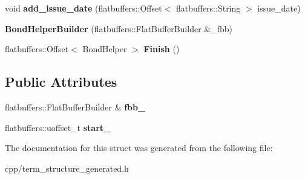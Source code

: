 \begin{DoxyCompactItemize}
\item 
\mbox{\label{structquantra_1_1BondHelperBuilder_a6804d109645fa6898895b99c344c244f}} 
void {\bfseries add\+\_\+issue\+\_\+date} (flatbuffers\+::\+Offset$<$ flatbuffers\+::\+String $>$ issue\+\_\+date)
\item 
\mbox{\label{structquantra_1_1BondHelperBuilder_a44d7b5fe25daab40afcc8d8e37cf4090}} 
{\bfseries Bond\+Helper\+Builder} (flatbuffers\+::\+Flat\+Buffer\+Builder \&\+\_\+fbb)
\item 
\mbox{\label{structquantra_1_1BondHelperBuilder_a6cec33d17e2561696a1509f91e795d40}} 
flatbuffers\+::\+Offset$<$ Bond\+Helper $>$ {\bfseries Finish} ()
\end{DoxyCompactItemize}
\subsection*{Public Attributes}
\begin{DoxyCompactItemize}
\item 
\mbox{\label{structquantra_1_1BondHelperBuilder_a6eb872e2f504d6136f1a453f4fb60fb1}} 
flatbuffers\+::\+Flat\+Buffer\+Builder \& {\bfseries fbb\+\_\+}
\item 
\mbox{\label{structquantra_1_1BondHelperBuilder_ad1b22434ea679d75aba50c841a11f808}} 
flatbuffers\+::uoffset\+\_\+t {\bfseries start\+\_\+}
\end{DoxyCompactItemize}


The documentation for this struct was generated from the following file\+:\begin{DoxyCompactItemize}
\item 
cpp/term\+\_\+structure\+\_\+generated.\+h\end{DoxyCompactItemize}
